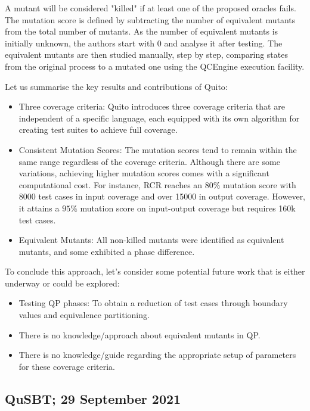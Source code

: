 \begin{itemize}
A mutant will be considered "killed" if at least one of the proposed oracles fails. The mutation score is defined by subtracting the number of equivalent mutants from the total number of mutants. As the number of equivalent mutants is initially unknown, the authors start with 0 and analyse it after testing. The equivalent mutants are then studied manually, step by step, comparing states from the original process to a mutated one using the QCEngine execution facility.\newline

Let us summarise the key results and contributions of Quito:
\begin{itemize}
    \item Three coverage criteria: Quito introduces three coverage criteria that are independent of a specific language, each equipped with its own algorithm for creating test suites to achieve full coverage.
    \item Consistent Mutation Scores: The mutation scores tend to remain within the same range regardless of the coverage criteria. Although there are some variations, achieving higher mutation scores comes with a significant computational cost. For instance, RCR reaches an $80\%$ mutation score with 8000 test cases in input coverage and over 15000 in output coverage. However, it attains a $95\%$ mutation score on input-output coverage but requires 160k test cases.
    \item Equivalent Mutants: All non-killed mutants were identified as equivalent mutants, and some exhibited a phase difference.
\end{itemize}

To conclude this approach, let's consider some potential future work that is either underway or could be explored:

\begin{itemize}
    \item Testing QP phases: To obtain a reduction of test cases through boundary values and equivalence partitioning.
    \item There is no knowledge/approach about equivalent mutants in QP.
    \item There is no knowledge/guide regarding the appropriate setup of parameters for these coverage criteria.
\end{itemize}

\vspace{15pt}
\subsection{QuSBT; 29 September 2021}


\end{itemize}
